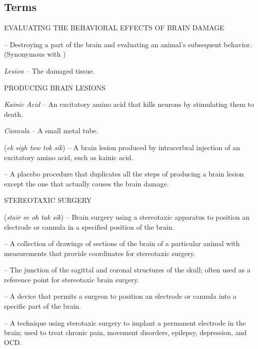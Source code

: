 \subsection{Terms}
\textsc{EVALUATING THE BEHAVIORAL EFFECTS OF BRAIN DAMAGE}
\begin{coloredlist}
    \item {} -- Destroying a part of the brain and evaluating an animal's subsequent behavior. (Synonymous with )
    \item \textit{Lesion} -- The damaged tissue.
\end{coloredlist}
\textsc{PRODUCING BRAIN LESIONS}
\begin{coloredlist}
    \item \textit{Kainic Acid} -- An excitatory amino acid that kills neurons by stimulating them to death.
    \item \textit{Cannula} -- A small metal tube.
    \item {} (\textit{ek sigh tow tok sik}) -- A brain lesion produced by intracerbral injection of an excitatory amino acid, such as kainic acid.
    \item {} -- A placebo procedure that duplicates all the steps of producing a brain lesion except the one that actually causes the brain damage.
\end{coloredlist}
\textsc{STEREOTAXIC SURGERY}
\begin{coloredlist}
    \item {} (\textit{stair ee oh tak sik}) -- Brain surgery using a stereotaxic apparatus to position an electrode or cannula in a specified position of the brain.
    \item {} -- A collection of drawings of sections of the brain of a particular animal with measurements that provide coordinates for stereotaxic surgery.
    \item {} -- The junction of the sagittal and coronal structures of the skull; often used as a reference point for stereotaxic brain surgery.
    \item {} -- A device that permits a surgeon to position an electrode or cannula into a specific part of the brain.
    \item {} -- A technique using sterotaxic surgery to implant a permanent electrode in the brain; used to treat chronic pain, movement disorders, epilepsy, depression, and OCD.
\end{coloredlist}
